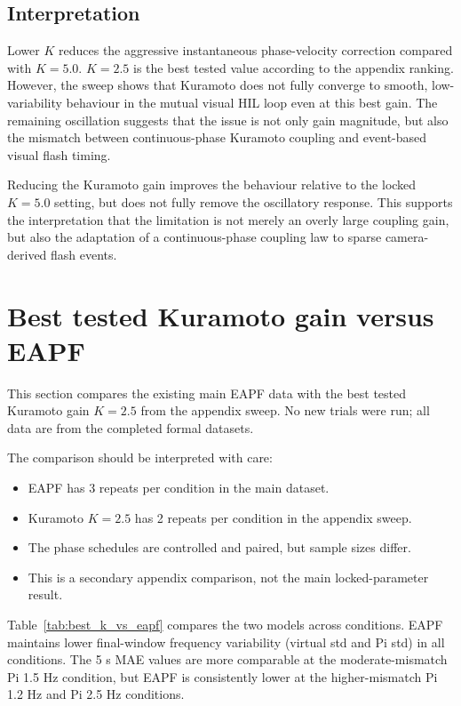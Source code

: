 \documentclass[11pt,a4paper]{article}
\newcommand{\tabledir}{tables}
\begin{document}
\subsection{Interpretation}

Lower $K$ reduces the aggressive instantaneous phase-velocity correction
compared with $K=5.0$. $K=2.5$ is the best tested value according to the
appendix ranking. However, the sweep shows that Kuramoto does not fully
converge to smooth, low-variability behaviour in the mutual visual HIL loop
even at this best gain. The remaining oscillation suggests that the issue is
not only gain magnitude, but also the mismatch between continuous-phase
Kuramoto coupling and event-based visual flash timing.

Reducing the Kuramoto gain improves the behaviour relative to the locked
$K=5.0$ setting, but does not fully remove the oscillatory response. This
supports the interpretation that the limitation is not merely an overly large
coupling gain, but also the adaptation of a continuous-phase coupling law to
sparse camera-derived flash events.

\section{Best tested Kuramoto gain versus EAPF}
\label{sec:best_k_vs_eapf}

This section compares the existing main EAPF data with the best tested
Kuramoto gain $K=2.5$ from the appendix sweep. No new trials were run; all
data are from the completed formal datasets.

The comparison should be interpreted with care:
\begin{itemize}
  \item EAPF has 3 repeats per condition in the main dataset.
  \item Kuramoto $K=2.5$ has 2 repeats per condition in the appendix sweep.
  \item The phase schedules are controlled and paired, but sample sizes differ.
  \item This is a secondary appendix comparison, not the main
        locked-parameter result.
\end{itemize}



Table~\ref{tab:best_k_vs_eapf} compares the two models across conditions.
EAPF maintains lower final-window frequency variability (virtual std and Pi
std) in all conditions. The 5 s MAE values are more comparable at the
moderate-mismatch Pi 1.5 Hz condition, but EAPF is consistently lower at the
higher-mismatch Pi 1.2 Hz and Pi 2.5 Hz conditions.
\end{document}
